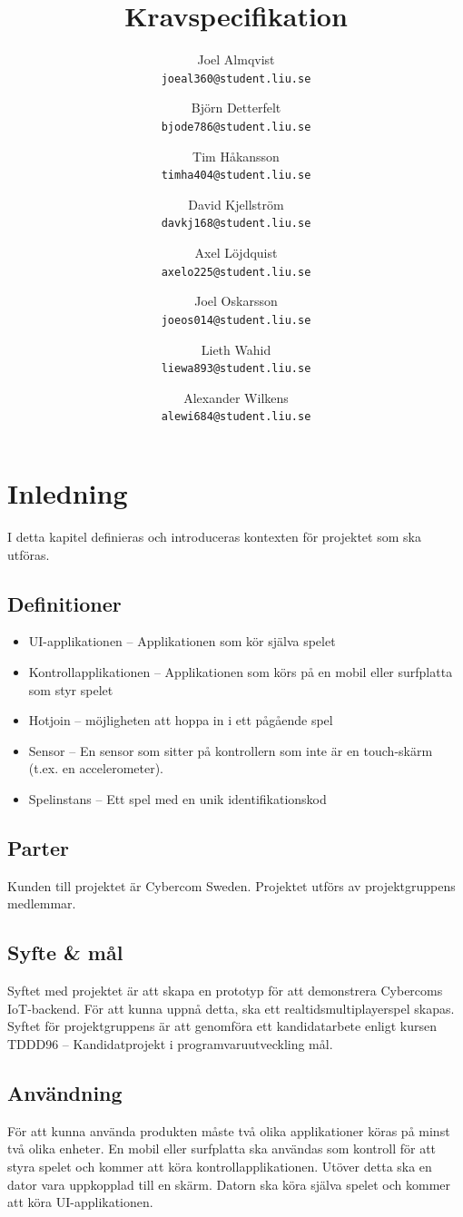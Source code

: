 \documentclass[10pt]{article}
\title{Kravspecifikation}
\author{
    Joel Almqvist\\
    \texttt{joeal360@student.liu.se}
    \and
    Björn Detterfelt\\
    \texttt{bjode786@student.liu.se}
    \and
    Tim Håkansson\\
    \texttt{timha404@student.liu.se}
    \and
    David Kjellström\\
    \texttt{davkj168@student.liu.se}
    \and
    Axel Löjdquist\\
    \texttt{axelo225@student.liu.se}
    \and
    Joel Oskarsson\\
    \texttt{joeos014@student.liu.se}
    \and
    Lieth Wahid\\
    \texttt{liewa893@student.liu.se}
    \and
    Alexander Wilkens\\
    \texttt{alewi684@student.liu.se}
}
\begin{document}
\maketitle
\pagebreak
\tableofcontents
\pagebreak
\section{Inledning}
	I detta kapitel definieras och introduceras kontexten för projektet som ska utföras.

	\subsection{Definitioner}
		\begin{itemize}
		\item UI-applikationen -- Applikationen som kör själva spelet
		\item Kontrollapplikationen -- Applikationen som körs på en mobil eller surfplatta som styr spelet
		\item Hotjoin -- möjligheten att hoppa in i ett pågående spel
		\item Sensor -- En sensor som sitter på kontrollern som inte är en touch-skärm (t.ex. en accelerometer).
		\item Spelinstans -- Ett spel med en unik identifikationskod
		\end{itemize}	

	\subsection{Parter}
	Kunden till projektet är Cybercom Sweden. Projektet utförs av projektgruppens medlemmar.
	
	\subsection{Syfte \& mål}
		Syftet med projektet är att skapa en prototyp för att demonstrera Cybercoms IoT-backend. För att kunna uppnå detta, ska ett realtidsmultiplayerspel skapas. Syftet för projektgruppens är att genomföra ett kandidatarbete enligt kursen TDDD96 -- Kandidatprojekt i programvaruutveckling mål.
	
	\subsection{Användning}
		För att kunna använda produkten måste två olika applikationer köras på minst två olika enheter. En mobil eller surfplatta ska användas som kontroll för att styra spelet och kommer att köra kontrollapplikationen. Utöver detta ska en dator vara uppkopplad till en skärm. Datorn ska köra själva spelet och kommer att köra UI-applikationen.  
	
\end{document}
